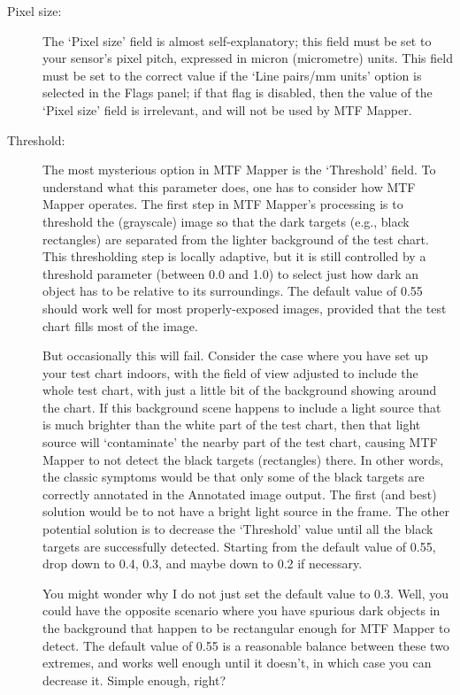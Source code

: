 \documentclass[a4paper]{article}
\begin{document}
\begin{description}
\item[Pixel size:]
The `Pixel size' field is almost self-explanatory; this field must be set to
your sensor's pixel pitch, expressed in micron (micrometre) units. This
field must be set to the correct value if the `Line pairs/mm units' option
is selected in the \textsf{Flags} panel; if that flag is disabled, then the
value of the `Pixel size' field is irrelevant, and will not be used by MTF
Mapper.

\item[Threshold:]
The most mysterious option in MTF Mapper is the `Threshold' field. To
understand what this parameter does, one has to consider how MTF Mapper
operates. The first step in MTF Mapper's processing is to threshold the
(grayscale) image so that the dark targets (e.g., black rectangles) are
separated from the lighter background of the test chart. This thresholding
step is locally adaptive, but it is still controlled by a threshold
parameter (between 0.0 and 1.0) to select just how dark an object has to be
relative to its surroundings. The default value of 0.55 should work well for
most properly-exposed images, provided that the test chart fills most of the
image.

But occasionally this will fail. Consider the case where you have set up
your test chart indoors, with the field of view adjusted to include the
whole test chart, with just a little bit of the background showing around
the chart. If this background scene happens to include a light source that
is much brighter than the white part of the test chart, then that light
source will `contaminate' the nearby part of the test chart, causing MTF
Mapper to not detect the black targets (rectangles) there. In other words,
the classic symptoms would be that only some of the black targets are
correctly annotated in the \textsf{Annotated image} output. The first (and
best) solution would be to not have a bright light source in the frame. 
The other potential solution is to decrease the `Threshold'
value until all the black targets are successfully detected. Starting from
the default value of 0.55, drop down to 0.4, 0.3, and maybe down to 0.2 if
necessary. 

You might wonder why I do not just set the default value to 0.3. Well, you
could have the opposite scenario where you have spurious dark objects in the
background that happen to be rectangular enough for MTF Mapper to detect.
The default value of 0.55 is a reasonable balance between these two
extremes, and works well enough until it doesn't, in which case you can
decrease it. Simple enough, right?


\end{description}
\end{document}
